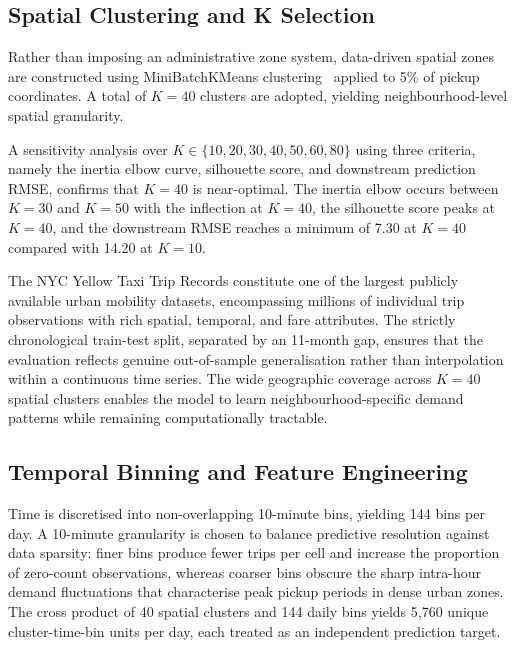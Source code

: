 \documentclass[a4paper,fleqn]{cas-dc}
\begin{document}
\subsection{Spatial Clustering and K Selection}
\label{sec:spatial}

Rather than imposing an administrative zone system, data-driven spatial zones are constructed using MiniBatchKMeans clustering~\cite{kmeans_mini} applied to 5\% of pickup coordinates.  A total of $K=40$ clusters are adopted, yielding neighbourhood-level spatial granularity.

A sensitivity analysis over $K \in \{10, 20, 30, 40, 50, 60, 80\}$ using three criteria, namely the inertia elbow curve, silhouette score, and downstream prediction RMSE, confirms that $K = 40$ is near-optimal.  The inertia elbow occurs between $K=30$ and $K=50$ with the inflection at $K=40$, the silhouette score peaks at $K=40$, and the downstream RMSE reaches a minimum of 7.30 at $K=40$ compared with 14.20 at $K=10$.

The NYC Yellow Taxi Trip Records constitute one of the largest publicly available urban mobility datasets, encompassing millions of individual trip observations with rich spatial, temporal, and fare attributes.  The strictly chronological train-test split, separated by an 11-month gap, ensures that the evaluation reflects genuine out-of-sample generalisation rather than interpolation within a continuous time series.  The wide geographic coverage across $K{=}40$ spatial clusters enables the model to learn neighbourhood-specific demand patterns while remaining computationally tractable.

\subsection{Temporal Binning and Feature Engineering}

Time is discretised into non-overlapping 10-minute bins, yielding 144 bins per day.  A 10-minute granularity is chosen to balance predictive resolution against data sparsity: finer bins produce fewer trips per cell and increase the proportion of zero-count observations, whereas coarser bins obscure the sharp intra-hour demand fluctuations that characterise peak pickup periods in dense urban zones.  The cross product of 40 spatial clusters and 144 daily bins yields 5,760 unique cluster-time-bin units per day, each treated as an independent prediction target.
\end{document}
